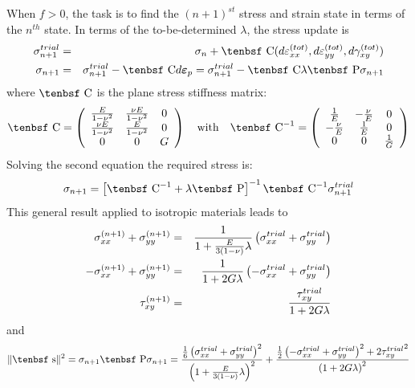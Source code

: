 \documentclass[11pt]{article}
\renewcommand{\vec}[1]{\boldsymbol{#1}}
\def\C{\hbox{\tenbsf C}}
\def\dev{\hbox{\tenbsf s}}
\def\dpl{d \vec{\varepsilon}_{p}}
\def\P{\hbox{\tenbsf P}}
\def\s#1{\sigma_{#1}}
\begin{document}
When $f>0$, the task is to find the $(n+1)^{st}$ stress and strain state in terms of the $n^{th}$ state. In terms of the to-be-determined $\lambda$, the stress update is
\begin{eqnarray}
        \s{n+1}^{trial} & = & \sigma_n + \C (d\varepsilon_{xx}^{(tot)},  d\varepsilon_{yy}^{(tot)}, d\gamma_{xy}^{(tot)})  \\
        \s{n+1} & = & \s{n+1}^{trial} - \C \dpl = \s{n+1}^{trial} - \C \lambda \P\s{n+1}
\end{eqnarray}
where $\C$ is the plane stress stiffness matrix:
\begin{equation}
          \C =  \left( \begin{array}{ccc}
                    {E\over 1-\nu^2} & {\nu E\over 1-\nu^2} & 0 \\ 
                    {\nu E\over 1-\nu^2} & {E\over 1-\nu^2} & 0 \\ 
                    0 & 0 & G \end{array}\right)
                   \quad {\rm with} \quad
          \C^{-1} =   \left( \begin{array}{ccc}
                    {1\over E} & -{\nu \over E} & 0 \\ 
                    -{\nu \over E} & {1\over E} & 0 \\ 
                    0 & 0 & {1\over G} \end{array}\right)
\end{equation}
Solving the second equation the required stress is:
\begin{equation}
       \s{n+1} = \left[\C^{-1} + \lambda\P\right]^{-1} \C^{-1}  \s{n+1}^{trial}
\end{equation}
This general result applied to isotropic materials leads to
\begin{eqnarray}
     \s{xx}^{(n+1)} + \s{yy}^{(n+1)} & = & {1\over 1 + { E\over 3(1-\nu)}\lambda} \left( \s{xx}^{trial} +  \s{yy}^{trial} \right) \\
     -\s{xx}^{(n+1)} + \s{yy}^{(n+1)} & = & {1\over 1 + 2 G\lambda} \left( -\s{xx}^{trial} +  \s{yy}^{trial} \right) \\
     \tau_{xy}^{(n+1)} & = & {\tau_{xy}^{trial}\over 1 + 2 G\lambda} 
\end{eqnarray}
and
\begin{equation}
    \|\dev\|^2 = \s{n+1}\P\s{n+1} = {{1\over 6}\left( \s{xx}^{trial} +  \s{yy}^{trial} \right)^2 \over \left( 1 + { E\over 3(1-\nu)}\lambda\right)^2}
             + {{1\over 2}\left( -\s{xx}^{trial} +  \s{yy}^{trial} \right)^2 + 2{\tau_{xy}^{trial}}^2 \over \left(1 + 2 G\lambda\right)^2}
\end{equation}
\end{document}
